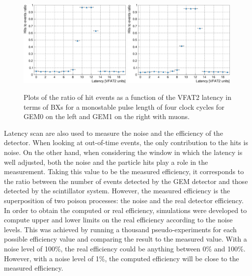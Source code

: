       \begin{figure}[h!]
        \centering
        \includegraphics[width=0.49\textwidth]{img/plots/cLatency_GEM0-crop}
        \includegraphics[width=0.49\textwidth]{img/plots/cLatency_GEM1-crop}
        \caption{Plots of the ratio of hit events as a function of the VFAT2 latency in terms of BXs for a monostable pulse length of four clock cycles for GEM0 on the left and GEM1 on the right with muons.}
        \label{fig:II-3-data-latency}
      \end{figure}

      Latency scan are also used to measure the noise and the efficiency of the detector. When looking at out-of-time events, the only contribution to the hits is noise. On the other hand, when considering the window in which the latency is well adjusted, both the noise and the particle hits play a role in the measurement. Taking this value to be the measured efficiency, it corresponds to the ratio between the number of events detected by the GEM detector and those detected by the scintillator system. However, the measured efficiency is the superposition of two poison processes: the noise and the real detector efficiency. In order to obtain the computed or real efficiency, simulations were developed to compute upper and lower limits on the real efficiency according to the noise levels. This was achieved by running a thousand pseudo-experiments for each possible efficiency value and comparing the result to the measured value. With a noise level of 100\%, the real efficiency could be anything between 0\% and 100\%. However, with a noise level of 1\%, the computed efficiency will be close to the measured efficiency.

